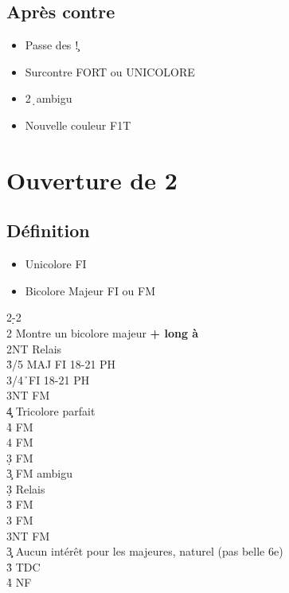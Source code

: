 \documentclass[a4paper]{article}
\begin{document}
\subsection{Après contre}

\begin{itemize}
\item Passe des \c !

\item Surcontre FORT ou UNICOLORE

\item 2\d\ ambigu

\item Nouvelle couleur F1T

\end{itemize}

\section{Ouverture de 2\pdfd}

\subsection{Définition}

\begin{itemize}
\item Unicolore FI

\item Bicolore Majeur FI ou FM

\end{itemize}

\begin{bidtable}
2\d-2\h\\
2\s \> Montre un bicolore majeur \textbf{+ long à \s }\+\\
2NT \> Relais\+\\
3\h {}/5 MAJ FI 18-21 PH\\
3\s {}\s /4\h\ FI 18-21 PH\\
3NT  FM\\
4\c\d \> Tricolore parfait\\
4\h {} FM\\
4\s {} FM\\
3\d {} FM\\
3\c \> FM ambigu\+\\
3\d \> Relais\+\\
3\h {} FM\\
3\s {} FM\\
3NT  FM\-\-\-\\
3\c\d \> Aucun intérêt pour les majeures, naturel (pas belle 6e)\\
3\h\s \> TDC\\
4\h\s \> NF\-
\end{bidtable}
\end{document}
